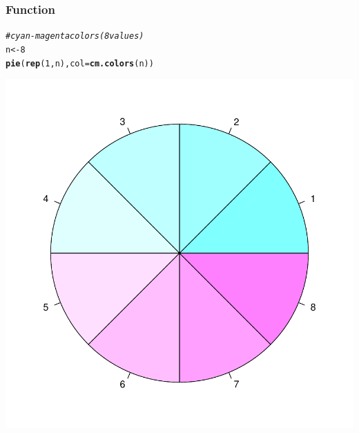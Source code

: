 \documentclass[12pt]{beamer}\usepackage[]{graphicx}\usepackage[]{color}
\makeatletter
\newcommand{\hlnum}[1]{\textcolor[rgb]{0.686,0.059,0.569}{#1}}%
\newcommand{\hlcom}[1]{\textcolor[rgb]{0.678,0.584,0.686}{\textit{#1}}}%
\newcommand{\hlstd}[1]{\textcolor[rgb]{0.345,0.345,0.345}{#1}}%
\newcommand{\hlkwb}[1]{\textcolor[rgb]{0.69,0.353,0.396}{#1}}%
\newcommand{\hlkwc}[1]{\textcolor[rgb]{0.333,0.667,0.333}{#1}}%
\newcommand{\hlkwd}[1]{\textcolor[rgb]{0.737,0.353,0.396}{\textbf{#1}}}%
\newenvironment{kframe}{%
 \def\at@end@of@kframe{}%
 \ifinner\ifhmode%
  \def\at@end@of@kframe{\end{minipage}}%
  \begin{minipage}{\columnwidth}%
 \fi\fi%
 \def\FrameCommand##1{\hskip\@totalleftmargin \hskip-\fboxsep
 \colorbox{shadecolor}{##1}\hskip-\fboxsep
     \hskip-\linewidth \hskip-\@totalleftmargin \hskip\columnwidth}%
 \MakeFramed {\advance\hsize-\width
   \@totalleftmargin\z@ \linewidth\hsize
   \@setminipage}}%
 {\par\unskip\endMakeFramed%
 \at@end@of@kframe}
\newenvironment{knitrout}{}{} %
\makeatother
\begin{document}
\begin{frame}[fragile]
\frametitle{Function }

\begin{knitrout}\scriptsize
{}\color{fgcolor}\begin{kframe}
\begin{alltt}
\hlcom{# cyan-magenta colors (8 values)}
\hlstd{n} \hlkwb{<-} \hlnum{8}
\hlkwd{pie}\hlstd{(}\hlkwd{rep}\hlstd{(}\hlnum{1}\hlstd{, n),} \hlkwc{col} \hlstd{=} \hlkwd{cm.colors}\hlstd{(n))}
\end{alltt}
\end{kframe}

{\centering \includegraphics[width=.4\linewidth,height=.4\linewidth]{figure/cmcolors-1} 

}



\end{knitrout}

\end{frame}

\end{document}
